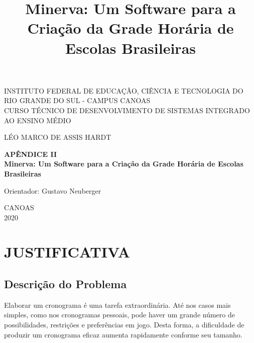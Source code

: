 \documentclass[12pt,a4paper]{article}
\title{Minerva:  Um Software para a Criação da Grade Horária de Escolas Brasileiras}
\newenvironment{bottompar}{\par\vspace*{\fill}}{\clearpage}
\begin{document}
		\thispagestyle{empty}

		\begin{center}
			INSTITUTO FEDERAL DE EDUCAÇÃO, CIÊNCIA E TECNOLOGIA DO RIO GRANDE DO SUL - CAMPUS CANOAS \\
			CURSO TÉCNICO DE DESENVOLVIMENTO DE SISTEMAS INTEGRADO AO ENSINO MÉDIO\\
		\end{center}

		\vskip 3cm

		\begin{center}
			LÉO MARCO DE ASSIS HARDT
		\end{center}

		\vskip 3cm

		\begin{center}
			\textbf{APÊNDICE II\\Minerva:  Um Software para a Criação da Grade Horária de Escolas Brasileiras}
		\end{center}

		\vskip 3cm

		\begin{center}
			Orientador: Gustavo Neuberger
		\end{center}

		\begin{bottompar}
			\begin{center}
			CANOAS \\
			2020
			\end{center}
		\end{bottompar}

    \section{JUSTIFICATIVA}

		\subsection{Descrição do Problema}

			\par Elaborar um cronograma é uma tarefa extraordinária. Até nos casos mais simples, como nos cronogramas pessoais, pode haver um grande número de possibilidades, restrições e preferências em jogo. Desta forma, a dificuldade de produzir um cronograma eficaz aumenta rapidamente conforme seu tamanho.
\end{document}
